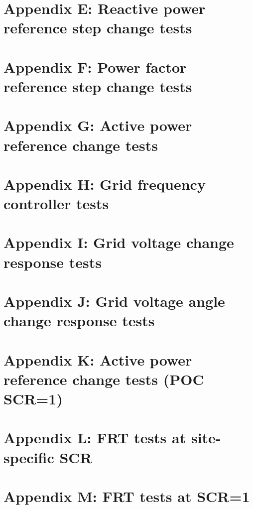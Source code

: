 \documentclass{../grid-link-report}
\begin{document}
	\section{Appendix E: Reactive power reference step change tests}
	\label{Appendix E: Reactive power reference step change tests}
	\section{Appendix F: Power factor reference step change tests}
	\label{Appendix F: Power factor reference step change tests}	
	\section{Appendix G: Active power reference change tests}
	\label{Appendix G: Active power reference change tests}
	\section{Appendix H: Grid frequency controller tests}
	\label{Appendix H: Grid frequency controller tests}
	\section{Appendix I: Grid voltage change response tests}
	\label{Appendix I: Grid voltage change response tests}
	\section{Appendix J: Grid voltage angle change response tests}
	\label{Appendix J: Grid voltage angle change response tests}
	\section{Appendix K: Active power reference change tests (POC SCR=1)}
	\label{Appendix K: Active power reference change tests (POC SCR=1)}
	\section{Appendix L: FRT tests at site-specific SCR}
	\label{Appendix L: FRT tests at site-specific SCR}
	\section{Appendix M: FRT tests at SCR=1}
	\label{Appendix M: FRT tests at SCR=1}
	
	
	
	
	
	
\end{document}
